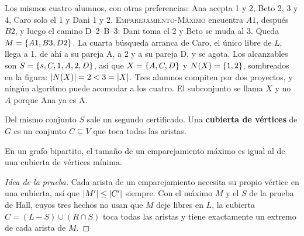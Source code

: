 \documentclass[11pt,letterpaper]{article}
\begin{document}
\begin{ejemplo}
  \label{ej:emparejamiento-hall}
  Los mismos cuatro alumnos, con otras preferencias: Ana acepta 1 y 2,
  Beto 2, 3 y 4, Caro solo el 1 y Dani 1 y 2.
  \textsc{Emparejamiento-Máximo} encuentra $A1$, después $B2$, y luego
  el camino D--2--B--3: Dani toma el 2 y Beto se muda al 3. Queda
  $M = \left\{ A1, B3, D2 \right\}$. La cuarta búsqueda arranca de Caro, el
  único libre de $L$, llega a 1, de ahí a su pareja A, a 2 y a su
  pareja D, y se agota. Los alcanzables son
  $S = \left\{ s, C, 1, A, 2, D \right\}$, así que $X = \left\{ A, C, D \right\}$ y
  $N(X) = \left\{ 1, 2 \right\}$, sombreados en la figura:
  $\left\lvert N(X) \right\rvert = 2 < 3 = \left\lvert X \right\rvert$. Tres alumnos compiten por dos
  proyectos, y ningún algoritmo puede acomodar a los cuatro. El
  subconjunto se llama $X$ y no $A$ porque Ana ya es A.
  \begin{center}
  \end{center}
\end{ejemplo}

Del mismo conjunto $S$ sale un segundo certificado. Una
\textbf{cubierta de vértices} de $G$ es un conjunto $C \subseteq V$
que toca todas las aristas.

\begin{teorema}[König]
  \label{teo:emparejamiento-konig}
  En un grafo bipartito, el tamaño de un emparejamiento máximo es
  igual al de una cubierta de vértices mínima.
\end{teorema}

\begin{proof}[Idea de la prueba]
  Cada arista de un emparejamiento necesita su propio vértice en una
  cubierta, así que $\left\lvert M' \right\rvert \le \left\lvert C' \right\rvert$ siempre. Con el máximo $M$
  y el $S$ de la prueba de Hall, cuyos tres hechos no usan que $M$
  deje libres en $L$, la cubierta $C = (L - S) \cup (R \cap S)$ toca
  todas las aristas y tiene exactamente un extremo de cada arista de
  $M$.
\end{proof}
\end{document}
